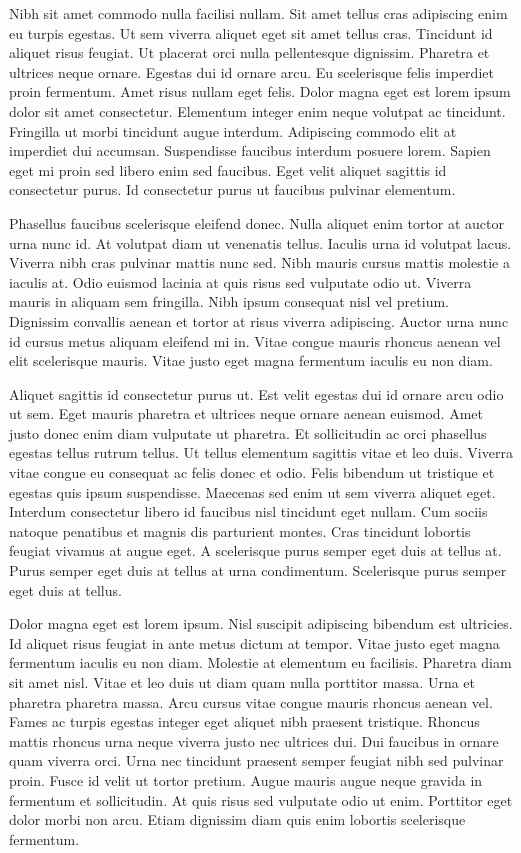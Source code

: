 \documentclass[11pt,a4paper]{article}
\begin{document}
Nibh sit amet commodo nulla facilisi nullam. Sit amet tellus cras adipiscing enim eu turpis egestas. Ut sem viverra aliquet eget sit amet tellus cras. Tincidunt id aliquet risus feugiat. Ut placerat orci nulla pellentesque dignissim. Pharetra et ultrices neque ornare. Egestas dui id ornare arcu. Eu scelerisque felis imperdiet proin fermentum. Amet risus nullam eget felis. Dolor magna eget est lorem ipsum dolor sit amet consectetur. Elementum integer enim neque volutpat ac tincidunt. Fringilla ut morbi tincidunt augue interdum. Adipiscing commodo elit at imperdiet dui accumsan. Suspendisse faucibus interdum posuere lorem. Sapien eget mi proin sed libero enim sed faucibus. Eget velit aliquet sagittis id consectetur purus. Id consectetur purus ut faucibus pulvinar elementum.

Phasellus faucibus scelerisque eleifend donec. Nulla aliquet enim tortor at auctor urna nunc id. At volutpat diam ut venenatis tellus. Iaculis urna id volutpat lacus. Viverra nibh cras pulvinar mattis nunc sed. Nibh mauris cursus mattis molestie a iaculis at. Odio euismod lacinia at quis risus sed vulputate odio ut. Viverra mauris in aliquam sem fringilla. Nibh ipsum consequat nisl vel pretium. Dignissim convallis aenean et tortor at risus viverra adipiscing. Auctor urna nunc id cursus metus aliquam eleifend mi in. Vitae congue mauris rhoncus aenean vel elit scelerisque mauris. Vitae justo eget magna fermentum iaculis eu non diam.

Aliquet sagittis id consectetur purus ut. Est velit egestas dui id ornare arcu odio ut sem. Eget mauris pharetra et ultrices neque ornare aenean euismod. Amet justo donec enim diam vulputate ut pharetra. Et sollicitudin ac orci phasellus egestas tellus rutrum tellus. Ut tellus elementum sagittis vitae et leo duis. Viverra vitae congue eu consequat ac felis donec et odio. Felis bibendum ut tristique et egestas quis ipsum suspendisse. Maecenas sed enim ut sem viverra aliquet eget. Interdum consectetur libero id faucibus nisl tincidunt eget nullam. Cum sociis natoque penatibus et magnis dis parturient montes. Cras tincidunt lobortis feugiat vivamus at augue eget. A scelerisque purus semper eget duis at tellus at. Purus semper eget duis at tellus at urna condimentum. Scelerisque purus semper eget duis at tellus.

Dolor magna eget est lorem ipsum. Nisl suscipit adipiscing bibendum est ultricies. Id aliquet risus feugiat in ante metus dictum at tempor. Vitae justo eget magna fermentum iaculis eu non diam. Molestie at elementum eu facilisis. Pharetra diam sit amet nisl. Vitae et leo duis ut diam quam nulla porttitor massa. Urna et pharetra pharetra massa. Arcu cursus vitae congue mauris rhoncus aenean vel. Fames ac turpis egestas integer eget aliquet nibh praesent tristique. Rhoncus mattis rhoncus urna neque viverra justo nec ultrices dui. Dui faucibus in ornare quam viverra orci. Urna nec tincidunt praesent semper feugiat nibh sed pulvinar proin. Fusce id velit ut tortor pretium. Augue mauris augue neque gravida in fermentum et sollicitudin. At quis risus sed vulputate odio ut enim. Porttitor eget dolor morbi non arcu. Etiam dignissim diam quis enim lobortis scelerisque fermentum.
\end{document}
